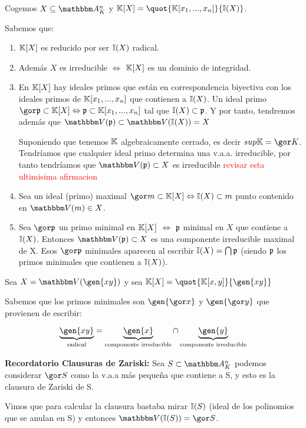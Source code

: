 Cogemos $X \subseteq \Akn$ y $\K[X]= \quot{\K[x_1,...,x_n]}{\I(X)}$.

Sabemos que:
\begin{enumerate}
	\item $\mathbb{K}[X]$ es reducido por ser $\mathbb{I}(X)$ radical.
	\item Además $X$ es irreducible $\Leftrightarrow$ $\mathbb{K}[X]$ es un dominio de integridad.
	\item En $\mathbb{K}[X]$ hay ideales primos que están en correspondencia biyectiva con los ideales primos de $\mathbb{K}[x_1,...,x_n]$ que contienen a $\mathbb{I}(X)$. Un ideal primo $\cls{\pideal} \subset \K[X] \Leftrightarrow \pideal \subset \K[x_1,...,x_n]$ tal que $\mathbb{I}(X) \subset \mathfrak{p}$. Y por tanto, tendremos además que  $\V(\pideal) \subset \V(\I(X))=X$
	
	Suponiendo que tenemos $\mathbb{K}$ algebraicamente cerrado, es decir $sup \K= \cls{K}$. Tendríamos que cualquier ideal primo determina una v.a.a. irreducible, por tanto tendríamos que $\V(\pideal)\subset X$ es irreducible \textcolor{red}{revisar esta ultimisima afirmacion}
	\item Sea un ideal (primo) maximal $\cls{m}  \subset \K[X] \Leftrightarrow \I(X) \subset m$ punto contenido en $\V(m) \in X$.
	\item Sea $\cls{\pideal}$ un primo minimal en $\mathbb{K}[X]$ $\Leftrightarrow$ $\mathfrak{p}$ minimal en $X$ que contiene a $\mathbb{I}(X)$. Entonces $\V(\pideal) \subset X$ es una componente irreducible maximal de X. Esos $\cls{\pideal}$ minimales aparecen al escribir $\mathbb{I}(X)= \bigcap \mathfrak{p}$ (siendo $\mathfrak{p}$ los primos minimales que contienen a $\mathbb{I}(X)$).
\end{enumerate}

\begin{example}
	Sea $X=\V(\gen{xy})$ y sea $\K[X]=\quot{\K[x,y]}{\gen{xy}}$
	
	Sabemos que los primos minimales son $\gen{\cls{x}}$ y $\gen{\cls{y}}$ que provienen de escribir:
	
	$$ \underbrace{\gen{xy}}_{\text{radical}} = \underbrace{\gen{x}}_{\text{componente irreducible}} \cap \underbrace{\gen{y}}_{\text{componente irreducible}}$$
\end{example}

\textbf{Recordatorio Clausuras de Zariski:} Sea $S \subset \Akn$ podemos considerar $\cls{S}$ como la v.a.a más pequeña que contiene a S, y esto es la clausura de Zariski de S.

Vimos que para calcular la clausura bastaba mirar $\mathbb{I}(S)$  (ideal de los polinomios que se anulan en S) y entonces $\V(\I(S))=\cls{S}$.

